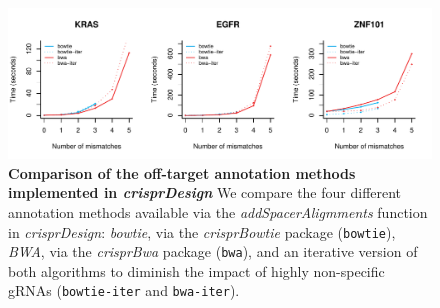 \documentclass[pdftex,english,10pt]{article}
\begin{document}
{%
\begin{figure}[!h]
\centering
\includegraphics[width=1\textwidth]{analyses/offtargets/figures/offtarget_comparison.pdf}
  \caption{\textbf{Comparison of the off-target annotation methods implemented in \textit{crisprDesign}} 
  We compare the four different annotation methods available via the  \textit{addSpacerAligmments} function in \textit{crisprDesign}: \textit{bowtie}, via the \textit{crisprBowtie} package (\texttt{bowtie}), \textit{BWA}, via the \textit{crisprBwa} package (\texttt{bwa}), and an iterative version of both algorithms to diminish the impact of highly non-specific gRNAs (\texttt{bowtie-iter} and \texttt{bwa-iter}).
  }
  \label{suppfig:offtargets}
\end{figure}



}
\end{document}
